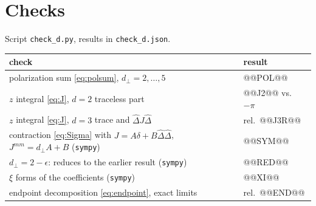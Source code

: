 \documentclass[10pt]{article}
\numberwithin{equation}{section}
\newcommand{\Dh}{\hat\Delta}
\begin{document}
\section{Checks}
Script \texttt{check\_d.py}, results in \texttt{check\_d.json}.
\begin{center}\small
\begin{tabular}{@{}p{}p{}@{}}\toprule
check & result\\\midrule
polarization sum \eqref{eq:polsum}, $d_\perp=2,\dots,5$ & @@POL@@\\
$z$ integral \eqref{eq:J}, $d=2$ traceless part & @@J2@@ vs.\ $-\pi$\\
$z$ integral \eqref{eq:J}, $d=3$ trace and $\Dh J\Dh$ & rel.\ @@J3R@@\\
contraction \eqref{eq:Sigma} with $J=A\delta+B\Dh\Dh$, $J^{mm}=d_\perp A+B$ (\texttt{sympy}) & @@SYM@@\\
$d_\perp=2-\epsilon$: reduces to the earlier result (\texttt{sympy}) & @@RED@@\\
$\xi$ forms of the coefficients (\texttt{sympy}) & @@XI@@\\
endpoint decomposition \eqref{eq:endpoint}, exact limits & rel.\ @@END@@\\\bottomrule
\end{tabular}
\end{center}
\end{document}
